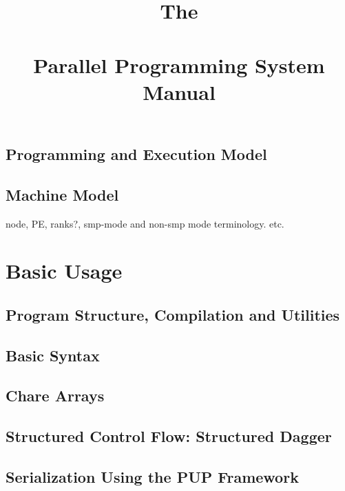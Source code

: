 \documentclass[10pt]{report}
\begin{document}
\title{The\\ \charm\\ Parallel Programming System\\ Manual}
\credits{\hspace{0 in}}
\maketitle


\chapter{Programming and Execution Model}



\chapter{Machine Model}
node, PE, ranks?, smp-mode and non-smp mode terminology. etc.

\part{Basic Usage}

\chapter{Program Structure, Compilation and Utilities}
  	
  
  

\chapter{Basic Syntax}
  	
  
  

\chapter{Chare Arrays}
  

\chapter{Structured Control Flow: Structured Dagger}
\label{sec:sdag}
  

\chapter{Serialization Using the PUP Framework}
  
\end{document}
